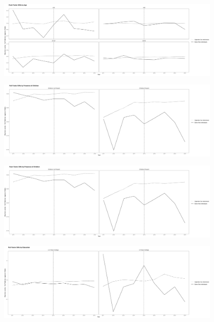 \documentclass[12pt,letterpaper]{article}
\begin{document}
\begin{figure}[htbp]
    \centering
    \includegraphics[width=0.75\linewidth]{outputs/summary_stats/age_ante_diffs.png}
    \caption{}
    \label{fig: fig:enter-label}
\end{figure}


\begin{figure}[htbp]
    \centering
    \includegraphics[width=0.75\linewidth]{outputs/summary_stats/child_post_diffs.png}
    \caption{}
    \label{fig: fig:enter-label}
\end{figure}

\begin{figure}[htbp]
    \centering
    \includegraphics[width=0.75\linewidth]{outputs/summary_stats/child_ante_diffs.png}
    \caption{}
    \label{fig: fig:enter-label}
\end{figure}

\begin{figure}[htbp]
    \centering
    \includegraphics[width=0.75\linewidth]{outputs/summary_stats/educ_post_diffs.png}
    \caption{}
    \label{fig: fig:enter-label}
\end{figure}
\end{document}
